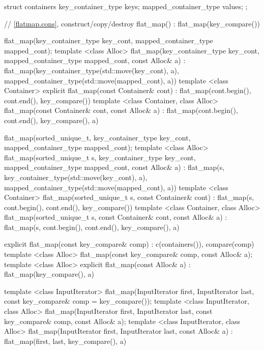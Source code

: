 \begin{codeblock}
\begin{codeblock}
\begin{codeblock}
\begin{addedblock}
\begin{codeblock}
{{    struct containers
    {
      key_container_type keys;
      mapped_container_type values;
    };

    // \ref{flatmap.cons}, construct/copy/destroy
    flat_map() : flat_map(key_compare()) { }

    flat_map(key_container_type key_cont, mapped_container_type mapped_cont);
    template <class Alloc>
    flat_map(key_container_type key_cont, mapped_container_type mapped_cont,
             const Alloc& a)
        : flat_map(key_container_type(std::move(key_cont), a),
                   mapped_container_type(std::move(mapped_cont), a))
      { }
    template <class Container>
      explicit flat_map(const Container& cont)
        : flat_map(cont.begin(), cont.end(), key_compare()) { }
    template <class Container, class Alloc>
      flat_map(const Container& cont, const Alloc& a)
        : flat_map(cont.begin(), cont.end(), key_compare(), a) { }

    flat_map(sorted_unique_t,
             key_container_type key_cont, mapped_container_type mapped_cont);
    template <class Alloc>
    flat_map(sorted_unique_t s, key_container_type key_cont,
             mapped_container_type mapped_cont, const Alloc& a)
        : flat_map(s, key_container_type(std::move(key_cont), a),
                   mapped_container_type(std::move(mapped_cont), a))
      { }
    template <class Container>
      flat_map(sorted_unique_t s, const Container& cont)
        : flat_map(s, cont.begin(), cont.end(), key_compare()) { }
    template <class Container, class Alloc>
      flat_map(sorted_unique_t s, const Container& cont, const Alloc& a)
        : flat_map(s, cont.begin(), cont.end(), key_compare(), a) { }

    explicit flat_map(const key_compare& comp)
      : c(containers()), compare(comp) { }
    template <class Alloc>
      flat_map(const key_compare& comp, const Alloc& a);
    template <class Alloc>
      explicit flat_map(const Alloc& a)
        : flat_map(key_compare(), a) { }

    template <class InputIterator>
      flat_map(InputIterator first, InputIterator last,
               const key_compare& comp = key_compare());
    template <class InputIterator, class Alloc>
      flat_map(InputIterator first, InputIterator last,
               const key_compare& comp, const Alloc& a);
    template <class InputIterator, class Alloc>
      flat_map(InputIterator first, InputIterator last,
               const Alloc& a)
        : flat_map(first, last, key_compare(), a) { }

}}
\end{codeblock}
\end{addedblock}
\end{codeblock}
\end{codeblock}
\end{codeblock}
